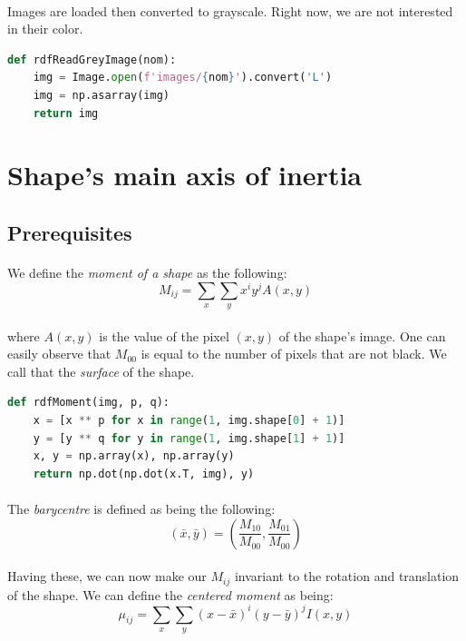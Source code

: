 \paragraph{}
Images are loaded then converted to grayscale. Right now, we are not interested in their color.

\begin{lstlisting}[language=Python, caption=Loading images in Python]
def rdfReadGreyImage(nom):
    img = Image.open(f'images/{nom}').convert('L')
    img = np.asarray(img)
    return img
\end{lstlisting}

\clearpage

\section{Shape's main axis of inertia}
\subsection{Prerequisites}
\paragraph{}
We define the \emph{moment of a shape} as the following:
$$M_{ij} = \sum_{x}\sum_{y} x^{i} y^{j} A(x, y)$$
\paragraph{}
where $A(x, y)$ is the value of the pixel $(x, y)$ of the shape's image. One can easily observe that $M_{00}$ is equal to the number of pixels that are not black. We call that the \emph{surface} of the shape.

\begin{lstlisting}[language=Python, caption=Calculating the moment of a shape]
def rdfMoment(img, p, q):
    x = [x ** p for x in range(1, img.shape[0] + 1)]
    y = [y ** q for y in range(1, img.shape[1] + 1)]
    x, y = np.array(x), np.array(y)
    return np.dot(np.dot(x.T, img), y)
\end{lstlisting}

\paragraph{}
The \emph{barycentre} is defined as being the following:
$$(\bar{x}, \bar{y}) = (\frac{M_{10}} {M_{00}}, \frac{M_{01}} {M_{00}})$$

\paragraph{}
Having these, we can now make our $M_{ij}$ invariant to the rotation and translation of the shape. We can define the \emph{centered moment} as being:
$$\mu_{ij} = \sum_{x}\sum_{y} (x - \bar{x})^i(y - \bar{y})^j I(x, y)$$


